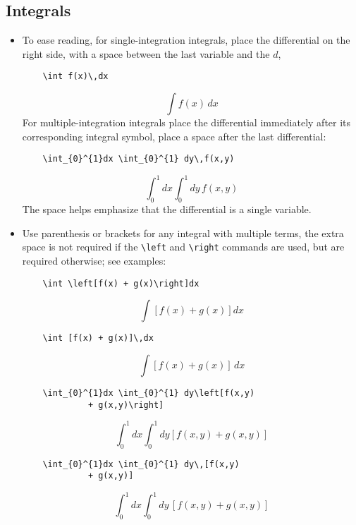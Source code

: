 \documentclass[10pt, letter]{article}
\begin{document}
\begin{multicols}{2}
\subsection{Integrals}\label{sec:integrals}
\begin{itemize}
\item To ease reading, for single-integration integrals, place the
  differential on the right side, with a space between the last
  variable and the $d$,
  \begin{lstlisting}
    \int f(x)\,dx
\end{lstlisting}
  \begin{equation*}
    \int f(x)\,dx
  \end{equation*}
  For multiple-integration integrals place the differential immediately after its corresponding
  integral symbol, place a space after the last differential:
\begin{lstlisting}
    \int_{0}^{1}dx \int_{0}^{1} dy\,f(x,y)
\end{lstlisting}
  \begin{equation*}
    \int_{0}^{1}dx \int_{0}^{1} dy\,f(x,y)
  \end{equation*}
  The space helps emphasize that the differential is a single variable. 
\item Use parenthesis or brackets for any integral with multiple
  terms, the extra space is not required if the \verb|\left| and
    \verb|\right| commands are used, but are required otherwise; see examples:
\begin{lstlisting}
    \int \left[f(x) + g(x)\right]dx
\end{lstlisting}
  \begin{equation*}
    \int \left[f(x) + g(x)\right]dx
  \end{equation*}
  \begin{lstlisting}
    \int [f(x) + g(x)]\,dx
\end{lstlisting}
  \begin{equation*}
    \int [f(x) + g(x)]\,dx
  \end{equation*}
\begin{lstlisting}
    \int_{0}^{1}dx \int_{0}^{1} dy\left[f(x,y) 
             + g(x,y)\right]
\end{lstlisting}
  \begin{equation*}
    \int_{0}^{1}dx \int_{0}^{1} dy\left[f(x,y) + g(x,y)\right]
  \end{equation*}
\begin{lstlisting}
    \int_{0}^{1}dx \int_{0}^{1} dy\,[f(x,y) 
             + g(x,y)]
\end{lstlisting}
  \begin{equation*}
    \int_{0}^{1}dx \int_{0}^{1} dy\,[f(x,y) + g(x,y)]
  \end{equation*}
\end{itemize}





\end{multicols}
\end{document}
